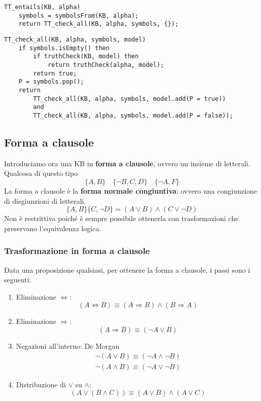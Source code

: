\begin{lstlisting}[style=pseudo-style]
TT_entails(KB, alpha)
	symbols = symbolsFrom(KB, alpha);
	return TT_check_all(KB, alpha, symbols, {});
\end{lstlisting}

\begin{lstlisting}[style=pseudo-style]
TT_check_all(KB, alpha, symbols, model)
	if symbols.isEmpty() then
		if truthCheck(KB, model) then
			return truthCheck(alpha, model);
		return true;
	P = symbols.pop();
	return
		TT_check_all(KB, alpha, symbols, model.add(P = true))
		and
		TT_check_all(KB, alpha, symbols, model.add(P = false));
\end{lstlisting}

\subsection{Forma a clausole}
Introduciamo ora una KB in \textbf{forma a clausole}, ovvero un insieme di letterali.
Qualcosa di questo tipo
\[ \{ A, B \} \quad \{ \lnot B, C, D \} \quad \{ \lnot A, F \} \]
La forma a clausole \`e la \textbf{forma normale congiuntiva}: ovvero una congiunzione di disgiunzioni di letterali.
\[ \{ A, B \} \{ C, \lnot D \} = (A \vee B) \wedge (C \vee \lnot D) \]
Non \`e restrittiva poich\'e \`e sempre possibile ottenerla con trasformazioni che preservano l'equivalenza logica.

\subsubsection{Trasformazione in forma a clausole}
Data una proposizione qualsiasi, per ottenere la forma a clausole, i passi sono i seguenti:
\begin{enumerate}
	\item Eliminazione $\Leftrightarrow$: \[ (A \Leftrightarrow B) \equiv (A \Rightarrow B) \wedge (B \Rightarrow A) \]
	\item Eliminazione $\Rightarrow$: \[ (A \Rightarrow B) \equiv (\lnot A \vee B) \]
	\item Negazioni all'interno: De Morgan
	      \begin{gather*}
		      \lnot (A \vee B) \equiv (\lnot A \wedge \lnot B) \\
		      \lnot (A \wedge B) \equiv (\lnot A \vee \lnot B)
	      \end{gather*}
	\item Distribuzione di $\vee$ su $\wedge$: \[ (A \vee (B \wedge C)) \equiv (A \vee B) \wedge (A \vee C) \]
\end{enumerate}

